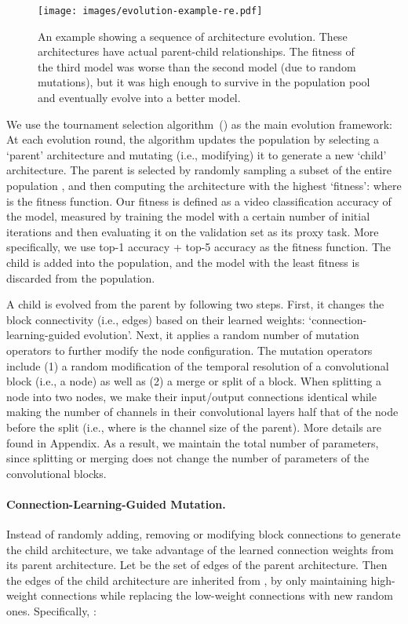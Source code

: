 \documentclass{article} \usepackage{iclr2020_conference,times}
\begin{document}
\begin{figure}
  \centering
\texttt{[image: images/evolution-example-re.pdf]}\caption{An example showing a sequence of architecture evolution. These architectures have  actual parent-child relationships. The fitness of the third model was worse than the second model (due to random mutations), but it was high enough to survive in the population pool and eventually evolve into a better model.}
  \label{fig:evolution-example}
\end{figure}




We use the tournament selection algorithm~(\citealp{goldberg91acomparative}) as the main evolution framework: At each evolution round, the algorithm updates the population by selecting a `parent' architecture and mutating (i.e., modifying) it to generate a new `child' architecture. The parent is selected by randomly sampling a subset of the entire population , and then computing the architecture with the highest `fitness':  where  is the fitness function. Our fitness is defined as a video classification accuracy of the model, measured by training the model with a certain number of initial iterations and then evaluating it on the validation set as its proxy task. More specifically, we use top-1 accuracy + top-5 accuracy as the fitness function. The child is added into the population, and the model with the least fitness is discarded from the population.

A child is evolved from the parent by following two steps. First, it changes the block connectivity (i.e., edges) based on their learned weights: `connection-learning-guided evolution'. Next, it applies a random number of mutation operators to further modify the node configuration. The mutation operators include (1) a random modification of the temporal resolution of a convolutional block (i.e., a node) as well as (2) a merge or split of a block. 
When splitting a node into two nodes, we make their input/output connections identical while making the number of channels in their convolutional layers half that of the node before the split (i.e.,  where  is the channel size of the parent). More details are found in Appendix. As a result, we maintain the total number of parameters, since splitting or merging does not change the number of parameters of the convolutional blocks.

\vspace{-5pt}
\paragraph{Connection-Learning-Guided Mutation.} Instead of randomly adding, removing or modifying block connections to generate the child architecture, we take advantage of the learned connection weights from its parent architecture. Let  be the set of edges of the parent architecture. Then the edges of the child architecture  are inherited from , by only maintaining high-weight connections while replacing the low-weight connections with new random ones. Specifically, :
\end{document}
